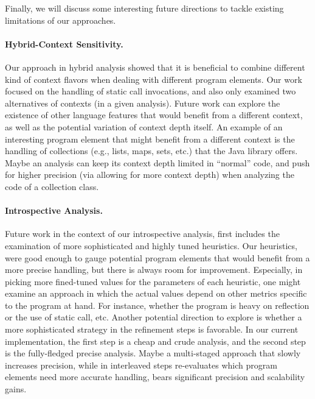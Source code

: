Finally, we will discuss some interesting future directions to tackle existing limitations of our approaches.

\paragraph{Hybrid-Context Sensitivity.}
Our approach in hybrid analysis showed that it is beneficial to combine different kind of context flavors when dealing with different program elements. Our work focused on the handling of static call invocations, and also only examined two alternatives of contexts (in a given analysis). Future work can explore the existence of other language features that would benefit from a different context, as well as the potential variation of context depth itself. An example of an interesting program element that might benefit from a different context is the handling of collections (e.g., lists, maps, sets, etc.) that the Java library offers. Maybe an analysis can keep its context depth limited in ``normal'' code, and push for higher precision (via allowing for more context depth) when analyzing the code of a collection class. 

\paragraph{Introspective Analysis.}
Future work in the context of our introspective analysis, first includes the examination of more sophisticated and highly tuned heuristics. Our heuristics, were good enough to gauge potential program elements that would benefit from a more precise handling, but there is always room for improvement. Especially, in picking more fined-tuned values for the parameters of each heuristic, one might examine an approach in which the actual values depend on other metrics specific to the program at hand. For instance, whether the program is heavy on reflection or the use of static call, etc. Another potential direction to explore is whether a more sophisticated strategy in the refinement steps is favorable. In our current implementation, the first step is a cheap and crude analysis, and the second step is the fully-fledged precise analysis. Maybe a multi-staged approach that slowly increases precision, while in interleaved steps re-evaluates which program elements need more accurate handling, bears significant precision and scalability gains.

